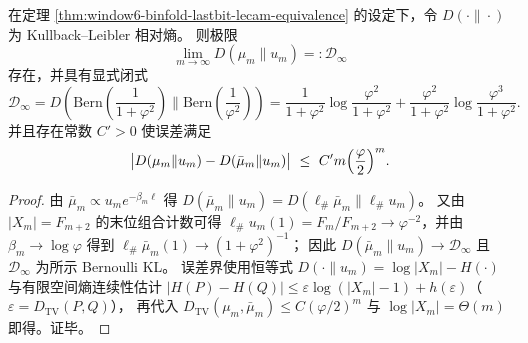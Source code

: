 \begin{corollary}\label{cor:window6-binfold-kl-limit-constant}
在定理 \ref{thm:window6-binfold-lastbit-lecam-equivalence} 的设定下，令 \(D(\cdot\|\cdot)\) 为 Kullback--Leibler 相对熵。
则极限
\[
\lim_{m\to\infty}D(\mu_m\|u_m)=:\mathcal D_\infty
\]
存在，并具有显式闭式
\[
\mathcal D_\infty
=D\!\left(\mathrm{Bern}\!\left(\frac{1}{1+\varphi^2}\right)\Big\|\mathrm{Bern}\!\left(\frac{1}{\varphi^2}\right)\right)
=\frac{1}{1+\varphi^2}\log\frac{\varphi^2}{1+\varphi^2}
+\frac{\varphi^2}{1+\varphi^2}\log\frac{\varphi^3}{1+\varphi^2}.
\]
并且存在常数 \(C'>0\) 使误差满足
\[
\bigl|D(\mu_m\|u_m)-D(\bar\mu_m\|u_m)\bigr|
\ \le\ C' m\Bigl(\frac{\varphi}{2}\Bigr)^m.
\]
\end{corollary}
\begin{proof}
由 \(\bar\mu_m\propto u_m e^{-\beta_m\ell}\) 得
\(D(\bar\mu_m\|u_m)=D(\ell_\#\bar\mu_m\|\ell_\#u_m)\)。
又由 \(|X_m|=F_{m+2}\) 的末位组合计数可得 \(\ell_\#u_m(1)=F_m/F_{m+2}\to \varphi^{-2}\)，并由 \(\beta_m\to\log\varphi\) 得到 \(\ell_\#\bar\mu_m(1)\to (1+\varphi^2)^{-1}\)；
因此 \(D(\bar\mu_m\|u_m)\to \mathcal D_\infty\) 且 \(\mathcal D_\infty\) 为所示 Bernoulli KL。
误差界使用恒等式 \(D(\cdot\|u_m)=\log|X_m|-H(\cdot)\) 与有限空间熵连续性估计
\(|H(P)-H(Q)|\le \varepsilon\log(|X_m|-1)+h(\varepsilon)\)（\(\varepsilon=D_{\mathrm{TV}}(P,Q)\)），
再代入 \(D_{\mathrm{TV}}(\mu_m,\bar\mu_m)\le C(\varphi/2)^m\) 与 \(\log|X_m|=\Theta(m)\) 即得。证毕。
\end{proof}

\endinput
